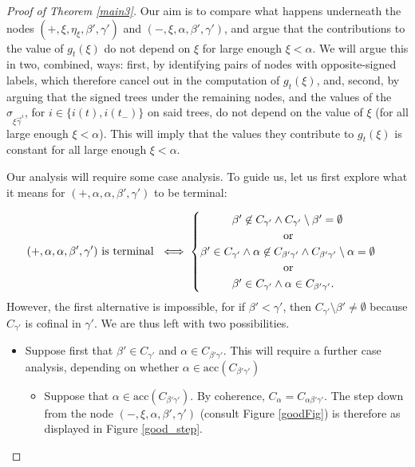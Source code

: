 \documentclass{amsart}
\numberwithin{theorem}{section}
\theoremstyle{definition}
\newcommand{\acc}{\mathrm{acc}}
\begin{document}
\begin{proof}[Proof of Theorem \ref{main3}]
Our aim is to compare what happens underneath the nodes $(+,\xi,\eta_\xi,\beta',\gamma')$ and $(-,\xi,\alpha,\beta',\gamma')$, and argue that the contributions to the value of $g_t(\xi)$ do not depend on $\xi$ for large enough $\xi<\alpha$. We will argue this in two, combined, ways: first, by identifying pairs of nodes with opposite-signed labels, which therefore cancel out in the computation of $g_t(\xi)$, and, second, by arguing that the signed trees under the remaining nodes, and the values of the $\sigma_{\xi\vec\gamma^i}$, for $i\in \{i(t),i(t_-)\}$ on said trees, do not depend on the value of $\xi$ (for all large enough $\xi<\alpha$). This will imply that the values they contribute to $g_t(\xi)$ is constant for all large enough $\xi<\alpha$.

Our analysis will require some case analysis. To guide us, let us first explore what it means for $(+,\alpha,\alpha,\beta',\gamma')$ to be terminal:

\begin{equation*}
(+,\alpha,\alpha,\beta',\gamma') \text{ is terminal } \iff \begin{cases}
\hspace{1cm}\beta'\not\in C_{\gamma'}\wedge C_{\gamma'}\setminus \beta'=\emptyset\\
\hspace{2.5cm} \text{ or }\\
\beta'\in C_{\gamma'}\wedge \alpha\not\in C_{\beta'\gamma'}\wedge C_{\beta'\gamma'}\setminus \alpha=\emptyset\\
\hspace{2.5cm}\text{ or }\\
\hspace{1cm}\beta'\in C_{\gamma'}\wedge \alpha\in C_{\beta'\gamma'}.
\end{cases}
\end{equation*}
However, the first alternative is impossible, for if $\beta'<\gamma'$, then $C_{\gamma'}\setminus\beta'\neq\emptyset$ because $C_{\gamma'}$ is cofinal in $\gamma'$. We are thus left with two possibilities.
\begin{itemize}
\item Suppose first that $\beta'\in C_{\gamma'}$ and $\alpha\in C_{\beta'\gamma'}$. This will require a further case analysis, depending on whether $\alpha\in\acc(C_{\beta'\gamma'})$
\begin{itemize}
\item Suppose that $\alpha\in\acc(C_{\beta'\gamma'})$. By coherence, $C_\alpha=C_{\alpha\beta'\gamma'}$. %
The step down from the node $(-,\xi,\alpha,\beta',\gamma')$ (consult Figure \ref{goodFig}) is therefore as displayed in Figure \ref{good_step}.


\end{itemize}
\end{itemize}
\end{proof}
\end{document}
